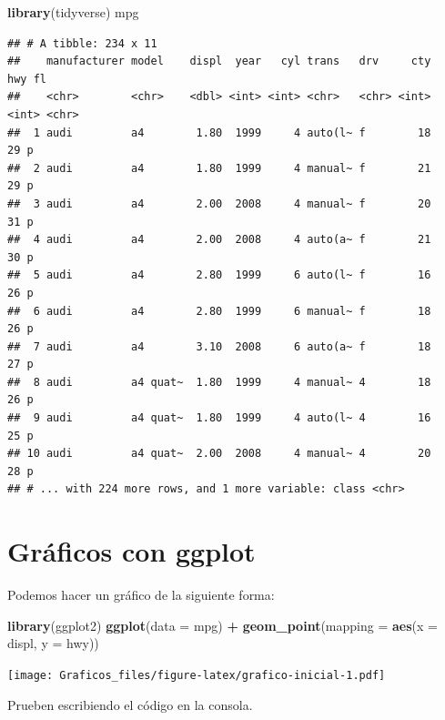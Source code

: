 \documentclass[]{book}
\newenvironment{Shaded}{\begin{snugshade}}{\end{snugshade}}
\newcommand{\DataTypeTok}[1]{\textcolor[rgb]{0.13,0.29,0.53}{#1}}
\newcommand{\KeywordTok}[1]{\textcolor[rgb]{0.13,0.29,0.53}{\textbf{#1}}}
\newcommand{\NormalTok}[1]{#1}
\newcommand{\OperatorTok}[1]{\textcolor[rgb]{0.81,0.36,0.00}{\textbf{#1}}}
\newcommand{\StringTok}[1]{\textcolor[rgb]{0.31,0.60,0.02}{#1}}
\theoremstyle{definition}
\theoremstyle{definition}
\theoremstyle{definition}
\theoremstyle{remark}
\begin{document}
\begin{Shaded}
\begin{Highlighting}[]
\KeywordTok{library}\NormalTok{(tidyverse)}
\NormalTok{mpg}
\end{Highlighting}
\end{Shaded}

\begin{verbatim}
## # A tibble: 234 x 11
##    manufacturer model    displ  year   cyl trans   drv     cty   hwy fl   
##    <chr>        <chr>    <dbl> <int> <int> <chr>   <chr> <int> <int> <chr>
##  1 audi         a4        1.80  1999     4 auto(l~ f        18    29 p    
##  2 audi         a4        1.80  1999     4 manual~ f        21    29 p    
##  3 audi         a4        2.00  2008     4 manual~ f        20    31 p    
##  4 audi         a4        2.00  2008     4 auto(a~ f        21    30 p    
##  5 audi         a4        2.80  1999     6 auto(l~ f        16    26 p    
##  6 audi         a4        2.80  1999     6 manual~ f        18    26 p    
##  7 audi         a4        3.10  2008     6 auto(a~ f        18    27 p    
##  8 audi         a4 quat~  1.80  1999     4 manual~ 4        18    26 p    
##  9 audi         a4 quat~  1.80  1999     4 auto(l~ 4        16    25 p    
## 10 audi         a4 quat~  2.00  2008     4 manual~ 4        20    28 p    
## # ... with 224 more rows, and 1 more variable: class <chr>
\end{verbatim}

\hypertarget{graficos-con-ggplot}{%
\section{Gráficos con ggplot}\label{graficos-con-ggplot}}

Podemos hacer un gráfico de la siguiente forma:

\begin{Shaded}
\begin{Highlighting}[]
\KeywordTok{library}\NormalTok{(ggplot2)}
\KeywordTok{ggplot}\NormalTok{(}\DataTypeTok{data =}\NormalTok{ mpg) }\OperatorTok{+}
\StringTok{ }\KeywordTok{geom_point}\NormalTok{(}\DataTypeTok{mapping =} \KeywordTok{aes}\NormalTok{(}\DataTypeTok{x =}\NormalTok{ displ, }\DataTypeTok{y =}\NormalTok{ hwy))}
\end{Highlighting}
\end{Shaded}

\texttt{[image: Graficos\_files/figure-latex/grafico-inicial-1.pdf]}

Prueben escribiendo el código en la consola.
\end{document}

